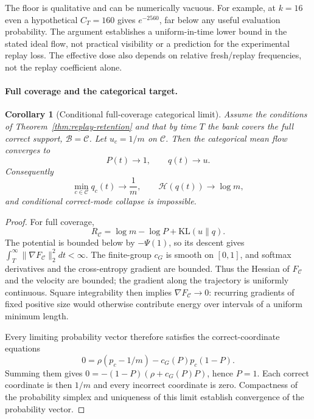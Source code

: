 \documentclass{article}
\newcommand{\1}{\mathbf 1}
\newtheorem{corollary}[lemma]{Corollary}
\theoremstyle{remark}
\theoremstyle{definition}
\theoremstyle{plain}
\begin{document}
The floor is qualitative and can be numerically vacuous. For example, at
$k=16$ even a hypothetical $C_T=160$ gives $e^{-2560}$, far below any useful
evaluation probability. The argument establishes a uniform-in-time lower
bound in the stated ideal flow, not practical visibility or a prediction for
the experimental replay loss. The effective dose also depends on relative
fresh/replay frequencies, not the replay coefficient alone.

\paragraph{Full coverage and the categorical target.}
\begin{corollary}[Conditional full-coverage categorical limit]
\label{cor:replay-no-collapse}
Assume the conditions of Theorem~\ref{thm:replay-retention} and that by time
$T$ the bank covers the full correct support, $\mathcal B=\mathcal C$. Let
$u_c=1/m$ on $\mathcal C$. Then the categorical mean flow converges to
\[
  P(t)\longrightarrow1,
  \qquad q(t)\longrightarrow u.
\]
Consequently
\[
  \min_{c\in\mathcal C}q_c(t)\longrightarrow\frac1m,
  \qquad
  \mathcal H(q(t))\longrightarrow\log m,
\]
and conditional correct-mode collapse is impossible.
\end{corollary}

\begin{proof}
For full coverage,
\begin{equation}
 R_{\mathcal C}=\log m-\log P+\mathrm{KL}(u\|q).
 \label{eq:replay-mass-uniformity-decomposition}
\end{equation}
The potential is bounded below by $-\Psi(1)$, so its descent gives
$\int_T^\infty\|\nabla F_{\mathcal C}\|_2^2dt<\infty$. The finite-group
$c_G$ is smooth on $[0,1]$, and softmax derivatives and the cross-entropy
gradient are bounded. Thus the Hessian of $F_{\mathcal C}$ and the velocity
are bounded; the gradient along the trajectory is uniformly continuous.
Square integrability then implies $\nabla F_{\mathcal C}\to0$: recurring
gradients of fixed positive size would otherwise contribute energy over
intervals of a uniform minimum length.

Every limiting probability vector therefore satisfies the correct-coordinate
equations
\[
 0=\rho(p_c-1/m)-c_G(P)p_c(1-P).
\]
Summing them gives $0=-(1-P)(\rho+c_G(P)P)$, hence $P=1$. Each correct
coordinate is then $1/m$ and every incorrect coordinate is zero. Compactness
of the probability simplex and uniqueness of this limit establish convergence
of the probability vector.
\end{proof}
\end{document}
